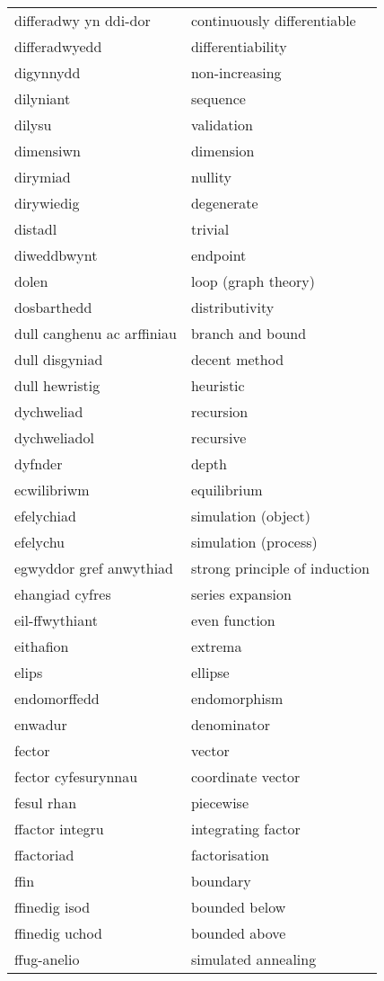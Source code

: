 \begin{supertabular}{p{0.22\textwidth}p{0.22\textwidth}}
differadwy yn ddi-dor & continuously differentiable \\
differadwyedd & differentiability \\
digynnydd & non-increasing \\
dilyniant & sequence \\
dilysu & validation \\
dimensiwn & dimension \\
dirymiad & nullity \\
dirywiedig & degenerate \\
distadl & trivial \\
diweddbwynt & endpoint \\
dolen & loop (graph theory) \\
dosbarthedd & distributivity \\
dull canghenu ac arffiniau & branch and bound \\
dull disgyniad & decent method \\
dull hewristig & heuristic \\
dychweliad & recursion \\
dychweliadol & recursive \\
dyfnder & depth \\
ecwilibriwm & equilibrium \\
efelychiad & simulation (object) \\
efelychu & simulation (process) \\
egwyddor gref anwythiad & strong principle of induction \\
ehangiad cyfres & series expansion \\
eil-ffwythiant & even function \\
eithafion & extrema \\
elips & ellipse \\
endomorffedd & endomorphism \\
enwadur & denominator \\
fector & vector \\
fector cyfesurynnau & coordinate vector \\
fesul rhan & piecewise \\
ffactor integru & integrating factor \\
ffactoriad & factorisation \\
ffin & boundary \\
ffinedig isod & bounded below \\
ffinedig uchod & bounded above \\
ffug-anelio & simulated annealing \\

\end{supertabular}
